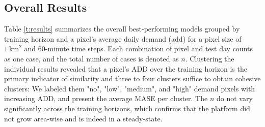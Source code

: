 \subsection{Overall Results}
\label{overall_results}

Table \ref{t:results} summarizes the overall best-performing models grouped by
    training horizon and a pixel's average daily demand (\gls{add}) for a
    pixel size of $1~\text{km}^2$ and 60-minute time steps.
Each combination of pixel and test day counts as one case, and the total
    number of cases is denoted as $n$.
Clustering the individual results revealed that a pixel's ADD over the
    training horizon is the primary indicator of similarity and three to four
    clusters suffice to obtain cohesive clusters:
We labeled them "no", "low", "medium", and "high" demand pixels with
    increasing ADD, and present the average MASE per cluster.
The $n$ do not vary significantly across the training horizons, which confirms
    that the platform did not grow area-wise and is indeed in a steady-state.

